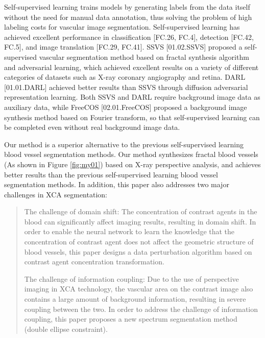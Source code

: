 Self-supervised learning trains models by generating labels from the data itself without the need for manual data annotation, thus solving the problem of high labeling costs for vascular image segmentation. Self-supervised learning has achieved excellent performance in classification [FC.26, FC.4], detection [FC.42, FC.5], and image translation [FC.29, FC.41]. SSVS [01.02.SSVS] proposed a self-supervised vascular segmentation method based on fractal synthesis algorithm and adversarial learning, which achieved excellent results on a variety of different categories of datasets such as X-ray coronary angiography and retina. DARL [01.01.DARL] achieved better results than SSVS through diffusion adversarial representation learning. Both SSVS and DARL require background image data as auxiliary data, while FreeCOS [02.01.FreeCOS] proposed a background image synthesis method based on Fourier transform, so that self-supervised learning can be completed even without real background image data.

Our method is a superior alternative to the previous self-supervised learning blood vessel segmentation methods. 
Our method synthesizes fractal blood vessels (As shown in Figure \cref{fig:my01}) based on X-ray perspective analysis, 
and achieves better results than the previous self-supervised learning blood vessel segmentation methods. 
In addition, this paper also addresses two major challenges in XCA segmentation:
\begin{quotation}
  \noindent
The challenge of domain shift: The concentration of contrast agents in the blood can significantly affect imaging results, resulting in domain shift. In order to enable the neural network to learn the knowledge that the concentration of contrast agent does not affect the geometric structure of blood vessels, this paper designs a data perturbation algorithm based on contrast agent concentration transformation.

The challenge of information coupling: Due to the use of perspective imaging in XCA technology, the vascular area on the contrast image also contains a large amount of background information, resulting in severe coupling between the two. In order to address the challenge of information coupling, this paper proposes a new spectrum segmentation method (double ellipse constraint).
  \end{quotation}

